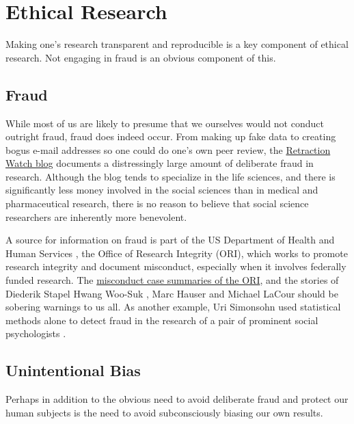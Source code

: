 \documentclass[12pt] {article}
\begin{document}
\section{Ethical Research}\label{ethical-research}

Making one's research transparent and reproducible is a key component of ethical research. Not engaging in fraud is an obvious component of this.

\subsection{Fraud}\label{fraud}

While most of us are likely to presume that we ourselves would not
conduct outright fraud, fraud does indeed occur. From making up fake
data to creating bogus e-mail addresses so one could do one's own peer
review, the \href{http://www.retractionwatch.com}{Retraction Watch blog}
documents a distressingly large amount of deliberate fraud in research.
Although the blog tends to specialize in the life sciences, and there is significantly less money involved in the social sciences than in medical and pharmaceutical research, there is no reason to believe that social science researchers are inherently
more benevolent. 

A source for information on fraud is part of the US Department of Health and Human Services
, the Office of Research Integrity (ORI), which works to promote research
integrity and document misconduct, especially when it involves federally
funded research. The \href{http://ori.hhs.gov/case_summary}{misconduct case summaries of the ORI}, and the stories of Diederik Stapel \citep{carey_noted_2011, bhattacharjee_diederik_2013} Hwang Woo-Suk \citep{cyranoski_cloning_2014}, Marc Hauser \citep{johnson_harvard_2012} and Michael LaCour \citep{broockman2015irreg} should be sobering warnings to us all. As another example, Uri Simonsohn used statistical methods alone to detect fraud in the research of a pair of prominent social psychologists \citep{simonsohn2013just}. 

\subsection{Unintentional Bias}\label{unintentional-bias}

Perhaps in addition to the obvious need to avoid deliberate fraud and
protect our human subjects is the need to avoid subconsciously biasing
our own results.
\end{document}

